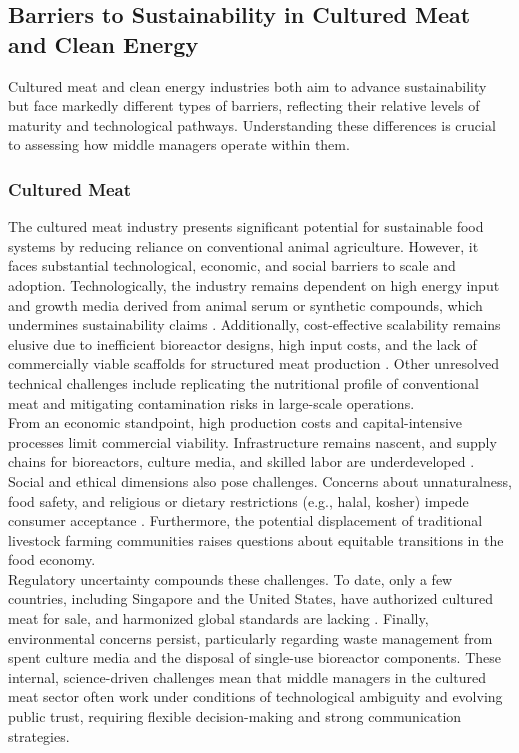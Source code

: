 	\subsection{Barriers to Sustainability in Cultured Meat and Clean Energy}
	Cultured meat and clean energy industries both aim to advance sustainability but face markedly different types of barriers, reflecting their relative levels of maturity and technological pathways. Understanding these differences is crucial to assessing how middle managers operate within them. \\
	
	\subsubsection{Cultured Meat}
	The cultured meat industry presents significant potential for sustainable food systems by reducing reliance on conventional animal agriculture. However, it faces substantial technological, economic, and social barriers to scale and adoption. Technologically, the industry remains dependent on high energy input and growth media derived from animal serum or synthetic compounds, which undermines sustainability claims \cite{Specht2023, Post2020}. Additionally, cost-effective scalability remains elusive due to inefficient bioreactor designs, high input costs, and the lack of commercially viable scaffolds for structured meat production \cite{Bodiou2020}. Other unresolved technical challenges include replicating the nutritional profile of conventional meat and mitigating contamination risks in large-scale operations. \\
	
	From an economic standpoint, high production costs and capital-intensive processes limit commercial viability. Infrastructure remains nascent, and supply chains for bioreactors, culture media, and skilled labor are underdeveloped \cite{Stephens2018}. Social and ethical dimensions also pose challenges. Concerns about unnaturalness, food safety, and religious or dietary restrictions (e.g., halal, kosher) impede consumer acceptance \cite{Bryant2020}. Furthermore, the potential displacement of traditional livestock farming communities raises questions about equitable transitions in the food economy. \\
	
	Regulatory uncertainty compounds these challenges. To date, only a few countries, including Singapore and the United States, have authorized cultured meat for sale, and harmonized global standards are lacking \cite{SFA2020, FDA2023}. Finally, environmental concerns persist, particularly regarding waste management from spent culture media and the disposal of single-use bioreactor components. These internal, science-driven challenges mean that middle managers in the cultured meat sector often work under conditions of technological ambiguity and evolving public trust, requiring flexible decision-making and strong communication strategies. \\
	
